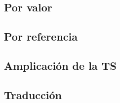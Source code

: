 \documentclass[hyperref={pdfpagelabels=false},tree-dvips]{beamer}
\begin{document}
\subsection{Por valor}
\subsection{Por referencia}
\subsection{Amplicación de la TS}
\subsection{Traducción}



\end{document}

